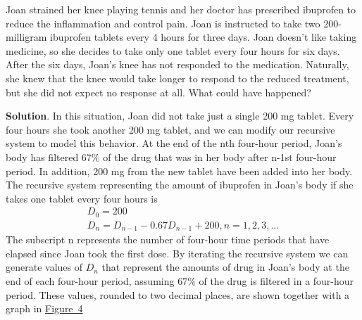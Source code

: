 \documentclass[10pt,]{book}
\theoremstyle{ptxdefinitionnotitle}
\theoremstyle{ptxdefinitiontitle}
\theoremstyle{ptxdefinitionnotitle}
\theoremstyle{ptxdefinitiontitle}
\theoremstyle{ptxdefinitionnotitle}
\theoremstyle{ptxdefinitiontitle}
\numberwithin{equation}{section}
\begin{document}
\begin{example}\label{example-2}
\hypertarget{p-16}{}%
Joan strained her knee playing tennis and her doctor has prescribed ibuprofen to reduce the inflammation and control pain.  Joan is instructed to take two 200-milligram ibuprofen tablets every 4 hours for three days.  Joan doesn’t like taking medicine, so she decides to take only one tablet every four hours for six days.  After the six days, Joan’s knee has not responded to the medication.  Naturally, she knew that the knee would take longer to respond to the reduced treatment, but she did not expect no response at all.  What could have happened?%
\par\smallskip%
\noindent\textbf{Solution}.\hypertarget{solution-2}{}\quad%
\hypertarget{p-17}{}%
In this situation, Joan did not take just a single 200 mg tablet.  Every four hours she took another 200 mg tablet, and we can modify our recursive system to model this behavior. At the end of the nth four-hour period, Joan’s body has filtered \(67\%\) of the drug that was in her body after n-1st  four-hour period.  In addition, 200 mg from the new tablet have been added into her body.  The recursive system representing the amount of ibuprofen in Joan’s body if she takes one tablet every four hours is%
%
\begin{gather*}
D_0=200\\
D_n=D_{n-1} - 0.67D_{n-1} + 200, n=1,2,3,...
\end{gather*}
\hypertarget{p-18}{}%
The subscript n represents the number of four-hour time periods that have elapsed since Joan took the first dose.  By iterating the recursive system we can generate values of \(D_n\) that represent the amounts of drug in Joan’s body at the end of each four-hour period, assuming  \(67\%\) of the drug is filtered in a four-hour period.  These values, rounded to two decimal places, are shown together with a graph in \hyperref[figure-ibuprofen-multi-dose]{Figure~4}%
\begin{figure}
\centering
\begin{sidebyside}{2}{0.0375}{0.0375}{0.075}
\begin{sbspanel}{0.2}
\end{sbspanel}

\end{sidebyside}
\end{figure}
\end{example}
\end{document}
